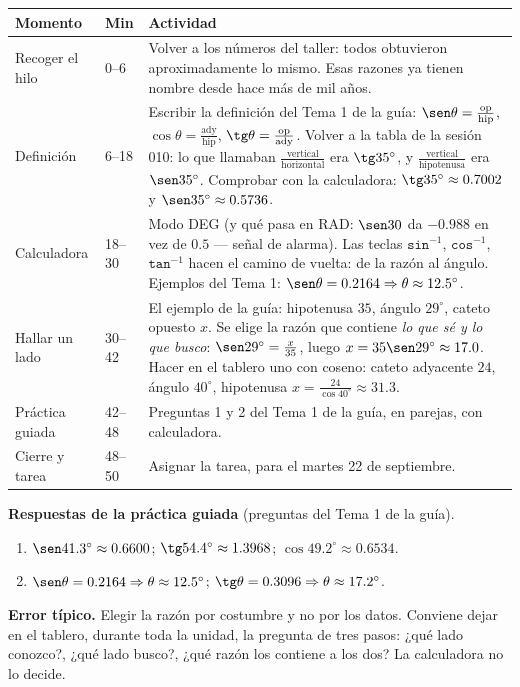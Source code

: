 \documentclass[11pt]{article}
\begin{document}
\begin{center}
{\renewcommand{\arraystretch}{1.3}
\begin{tabularx}{\linewidth}{@{}l l X@{}}
  \toprule
  \textbf{Momento} & \textbf{Min} & \textbf{Actividad}\\
  \midrule
  Recoger el hilo & 0--6 & Volver a los números del taller: todos obtuvieron
    aproximadamente lo mismo. Esas razones ya tienen nombre desde hace más de mil años.\\
  Definición & 6--18 & Escribir la definición del Tema 1 de la guía:
    $\sen\theta = \frac{\text{op}}{\text{hip}}$,
    $\cos\theta = \frac{\text{ady}}{\text{hip}}$,
    $\tg\theta = \frac{\text{op}}{\text{ady}}$. Volver a la tabla de la sesión 010: lo que
    llamaban $\frac{\text{vertical}}{\text{horizontal}}$ era $\tg 35^\circ$, y
    $\frac{\text{vertical}}{\text{hipotenusa}}$ era $\sen 35^\circ$. Comprobar con la
    calculadora: $\tg 35^\circ \approx \num{0,7002}$ y $\sen 35^\circ \approx \num{0,5736}$.\\
  Calculadora & 18--30 & Modo DEG (y qué pasa en RAD: $\sen 30$ da $\num{-0,988}$ en vez de
    $\num{0,5}$ — señal de alarma). Las teclas $\texttt{sin}^{-1}$, $\texttt{cos}^{-1}$,
    $\texttt{tan}^{-1}$ hacen el camino de vuelta: de la razón al ángulo. Ejemplos del
    Tema 1: $\sen\theta = \num{0,2164} \Rightarrow \theta \approx \num{12,5}^\circ$.\\
  Hallar un lado & 30--42 & El ejemplo de la guía: hipotenusa $35$, ángulo $29^\circ$,
    cateto opuesto $x$. Se elige la razón que contiene \emph{lo que sé y lo que busco}:
    $\sen 29^\circ = \frac{x}{35}$, luego $x = 35\sen 29^\circ \approx \num{17,0}$. Hacer
    en el tablero uno con coseno: cateto adyacente $24$, ángulo $40^\circ$, hipotenusa
    $x = \frac{24}{\cos 40^\circ} \approx \num{31,3}$.\\
  Práctica guiada & 42--48 & Preguntas 1 y 2 del Tema 1 de la guía, en parejas, con
    calculadora.\\
  Cierre y tarea & 48--50 & Asignar la tarea, para el martes 22 de septiembre.\\
  \bottomrule
\end{tabularx}}
\end{center}

\textbf{Respuestas de la práctica guiada} (preguntas del Tema 1 de la guía).
\begin{enumerate}
  \item $\sen\num{41,3}^\circ \approx \num{0,6600}$; \quad
    $\tg\num{54,4}^\circ \approx \num{1,3968}$; \quad
    $\cos\num{49,2}^\circ \approx \num{0,6534}$.
  \item $\sen\theta = \num{0,2164} \Rightarrow \theta \approx \num{12,5}^\circ$; \quad
    $\tg\theta = \num{0,3096} \Rightarrow \theta \approx \num{17,2}^\circ$.
\end{enumerate}

\begin{nota}
\textbf{Error típico.} Elegir la razón por costumbre y no por los datos. Conviene dejar en
el tablero, durante toda la unidad, la pregunta de tres pasos: ¿qué lado conozco?, ¿qué
lado busco?, ¿qué razón los contiene a los dos? La calculadora no lo decide.
\end{nota}
\end{document}
